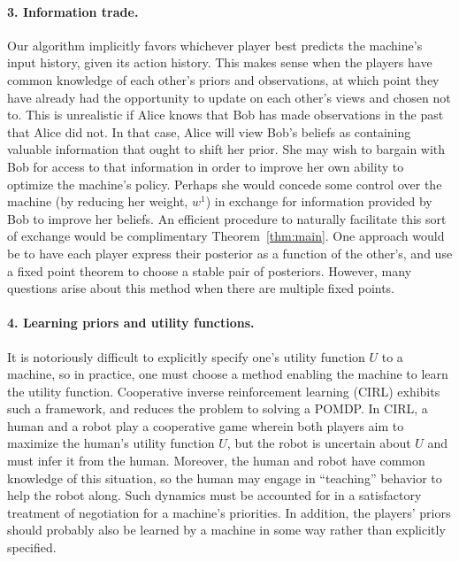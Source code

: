 \documentclass{article}
\newcommand{\thm}[1]{Theorem~\ref{thm:#1}}
\begin{document}
\paragraph{3. Information trade.}  Our algorithm implicitly favors whichever player best predicts the machine's input history, given its action history.  This makes sense when the players have common knowledge of each other's priors and observations, at which point they have already had the opportunity to update on each other's views and chosen not to.  This is unrealistic if Alice knows that Bob has made observations in the past that Alice did not.  In that case, Alice will view Bob's beliefs as containing valuable information that ought to shift her prior.  She may wish to bargain with Bob for access to that information in order to improve her own ability to optimize the machine's policy.  Perhaps she would concede some control over the machine (by reducing her weight, $w^1$) in exchange for information provided by Bob to improve her beliefs.  An efficient procedure to naturally facilitate this sort of exchange would be complimentary \thm{main}.  One approach would be to have each player express their posterior as a function of the other's, and use a fixed point theorem to choose a stable pair of posteriors.  However, many questions arise about this method when there are multiple fixed points.

\paragraph{4. Learning priors and utility functions.}  It is notoriously difficult to explicitly specify one's utility function $U$ to a machine, so in practice, one must choose a method enabling the machine to learn the utility function.  Cooperative inverse reinforcement learning (CIRL) \citep{hadfield2016cooperative} exhibits such a framework, and reduces the problem to solving a POMDP.   In CIRL, a human and a robot play a cooperative game wherein both players aim to maximize the human's utility function $U$, but the robot is uncertain about $U$ and must infer it from the human.  Moreover, the human and robot have common knowledge of this situation, so the human may engage in ``teaching'' behavior to help the robot along.  Such dynamics must be accounted for in a satisfactory treatment of negotiation for a machine's priorities.  In addition, the players' priors should probably also be learned by a machine in some way rather than explicitly specified.
\end{document}
